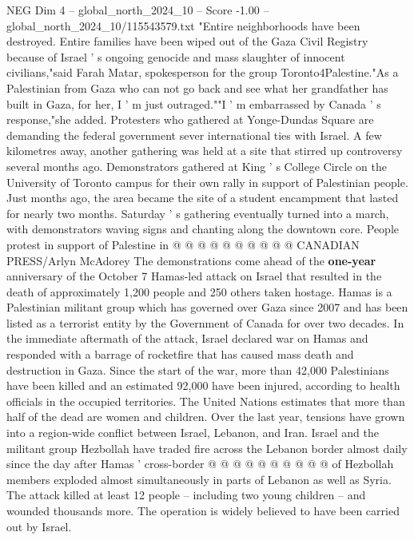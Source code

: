 \begin{textsample}{NEG Dim 4 – global\_north\_2024\_10 – Score -1.00 – global\_north\_2024\_10/115543579.txt}  \label{ex:f4_neg_051}
"Entire neighborhoods have been destroyed.
Entire families have been wiped out of the Gaza Civil Registry because of Israel ' s ongoing genocide and mass slaughter of innocent civilians,"said Farah Matar, spokesperson for the group Toronto4Palestine."As a Palestinian from Gaza who can not go back and see what her grandfather has built in Gaza, for her, I ' m just outraged.""I ' m embarrassed by Canada ' s response,"she added.
Protesters who gathered at Yonge-Dundas Square are demanding the federal government sever international ties with Israel.
A few kilometres away, another gathering was held at a site that stirred up controversy several months ago.
Demonstrators gathered at King ' s College Circle on the University of Toronto campus for their own rally in support of Palestinian people.
Just months ago, the area became the site of a student encampment that lasted for nearly two months.
Saturday ' s gathering eventually turned into a march, with demonstrators waving signs and chanting along the downtown core.
People protest in support of Palestine in @ @ @ @ @ @ @ @ @ @ CANADIAN PRESS/Arlyn McAdorey The demonstrations come ahead of the \textbf{one-year} anniversary of the October 7 Hamas-led attack on Israel that resulted in the death of approximately 1,200 people and 250 others taken hostage.
Hamas is a Palestinian militant group which has governed over Gaza since 2007 and has been listed as a terrorist entity by the Government of Canada for over two decades.
In the immediate aftermath of the attack, Israel declared war on Hamas and responded with a barrage of rocketfire that has caused mass death and destruction in Gaza.
Since the start of the war, more than 42,000 Palestinians have been killed and an estimated 92,000 have been injured, according to health officials in the occupied territories.
The United Nations estimates that more than half of the dead are women and children.
Over the last year, tensions have grown into a region-wide conflict between Israel, Lebanon, and Iran.
Israel and the militant group Hezbollah have traded fire across the Lebanon border almost daily since the day after Hamas ' cross-border @ @ @ @ @ @ @ @ @ @ of Hezbollah members exploded almost simultaneously in parts of Lebanon as well as Syria.
The attack killed at least 12 people -- including two young children -- and wounded thousands more.
The operation is widely believed to have been carried out by Israel.

\end{textsample}
